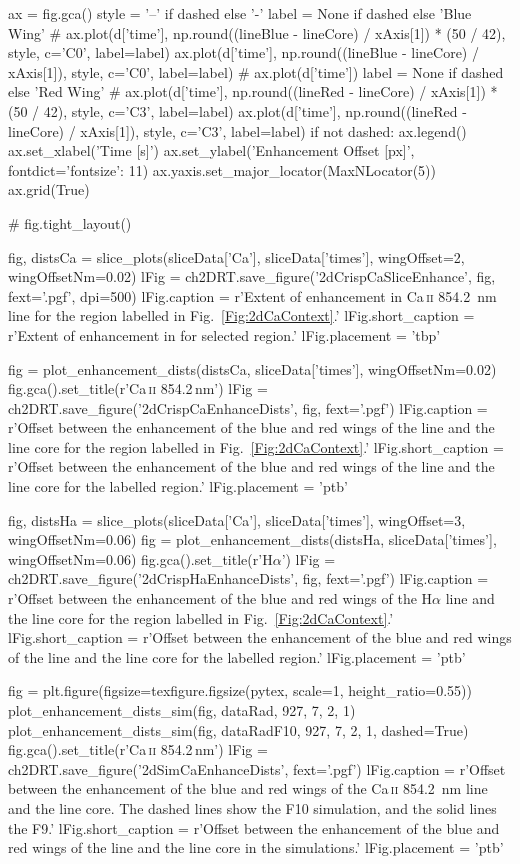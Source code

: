 \begin{pycode}[2DRT]
    ax = fig.gca()
    style = '--' if dashed else '-'
    label = None if dashed else 'Blue Wing'
    # ax.plot(d['time'], np.round((lineBlue - lineCore) / xAxis[1]) * (50 / 42), style, c='C0', label=label)
    ax.plot(d['time'], np.round((lineBlue - lineCore) / xAxis[1]), style, c='C0', label=label)
#     ax.plot(d['time'])
    label = None if dashed else 'Red Wing'
    # ax.plot(d['time'], np.round((lineRed - lineCore) / xAxis[1]) * (50 / 42), style, c='C3', label=label)
    ax.plot(d['time'], np.round((lineRed - lineCore) / xAxis[1]), style, c='C3', label=label)
    if not dashed:
        ax.legend()
    ax.set_xlabel('Time [s]')
    ax.set_ylabel('Enhancement Offset [px]', fontdict={'fontsize': 11})
    ax.yaxis.set_major_locator(MaxNLocator(5))
    ax.grid(True)

    # fig.tight_layout()

fig, distsCa = slice_plots(sliceData['Ca'], sliceData['times'], wingOffset=2, wingOffsetNm=0.02)
lFig = ch2DRT.save_figure('2dCrispCaSliceEnhance', fig, fext='.pgf', dpi=500)
lFig.caption = r'Extent of enhancement in Ca\,\textsc{ii} \SI{854.2}{\nano\metre} line for the region labelled in Fig.~\ref{Fig:2dCaContext}.'
lFig.short_caption = r'Extent of enhancement in \CaLine{} for selected region.'
lFig.placement = 'tbp'

fig = plot_enhancement_dists(distsCa, sliceData['times'], wingOffsetNm=0.02)
fig.gca().set_title(r'Ca\,\textsc{ii} 854.2\,nm')
lFig = ch2DRT.save_figure('2dCrispCaEnhanceDists', fig, fext='.pgf')
lFig.caption = r'Offset between the enhancement of the blue and red wings of the \CaLine{} line and the line core for the region labelled in Fig.~\ref{Fig:2dCaContext}.'
lFig.short_caption = r'Offset between the enhancement of the blue and red wings of the \CaLine{} line and the line core for the labelled region.'
lFig.placement = 'ptb'

fig, distsHa = slice_plots(sliceData['Ca'], sliceData['times'], wingOffset=3, wingOffsetNm=0.06)
fig = plot_enhancement_dists(distsHa, sliceData['times'], wingOffsetNm=0.06)
fig.gca().set_title(r'H$\alpha$')
lFig = ch2DRT.save_figure('2dCrispHaEnhanceDists', fig, fext='.pgf')
lFig.caption = r'Offset between the enhancement of the blue and red wings of the H$\alpha$ line and the line core for the region labelled in Fig.~\ref{Fig:2dCaContext}.'
lFig.short_caption = r'Offset between the enhancement of the blue and red wings of the \Ha{} line and the line core for the labelled region.'
lFig.placement = 'ptb'

fig = plt.figure(figsize=texfigure.figsize(pytex, scale=1, height_ratio=0.55))
plot_enhancement_dists_sim(fig, dataRad, 927, 7, 2, 1)
plot_enhancement_dists_sim(fig, dataRadF10, 927, 7, 2, 1, dashed=True)
fig.gca().set_title(r'Ca\,\textsc{ii} 854.2\,nm')
lFig = ch2DRT.save_figure('2dSimCaEnhanceDists', fext='.pgf')
lFig.caption = r'Offset between the enhancement of the blue and red wings of the Ca\,\textsc{ii} \SI{854.2}{\nano\metre} line and the line core. The dashed lines show the F10 simulation, and the solid lines the F9.'
lFig.short_caption = r'Offset between the enhancement of the blue and red wings of the \CaLine{} line and the line core in the simulations.'
lFig.placement = 'ptb'


\end{pycode}

